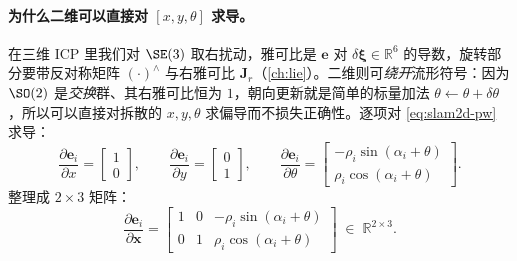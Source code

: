 \paragraph{为什么二维可以直接对 $[x,y,\theta]$ 求导。}
在三维 ICP 里我们对 $\SE(3)$ 取右扰动，雅可比是 $\mathbf{e}$ 对 $\delta\boldsymbol{\xi}\in\mathbb{R}^6$ 的导数，旋转部分要带反对称矩阵 $(\cdot)^\wedge$ 与右雅可比 $\mathbf{J}_r$（\cref{ch:lie}）。二维则可\emph{绕开}流形符号：因为 $\SO(2)$ 是\emph{交换}群、其右雅可比恒为 $1$，朝向更新就是简单的标量加法 $\theta\leftarrow\theta+\delta\theta$，所以可以直接对拆散的 $x,y,\theta$ 求偏导而不损失正确性。逐项对 \cref{eq:slam2d-pw} 求导：
\begin{equation}
\frac{\partial\mathbf{e}_i}{\partial x}=\begin{bmatrix}1\\0\end{bmatrix},\qquad
\frac{\partial\mathbf{e}_i}{\partial y}=\begin{bmatrix}0\\1\end{bmatrix},\qquad
\frac{\partial\mathbf{e}_i}{\partial\theta}=\begin{bmatrix}-\rho_i\sin(\alpha_i+\theta)\\ \rho_i\cos(\alpha_i+\theta)\end{bmatrix}.
\label{eq:slam2d-p2p-jcol}
\end{equation}
整理成 $2\times 3$ 矩阵：
\begin{equation}
\frac{\partial\mathbf{e}_i}{\partial\mathbf{x}}=
\begin{bmatrix}
1 & 0 & -\rho_i\sin(\alpha_i+\theta)\\
0 & 1 & \rho_i\cos(\alpha_i+\theta)
\end{bmatrix}\;\in\;\mathbb{R}^{2\times 3}.
\label{eq:slam2d-p2p-J}
\end{equation}

